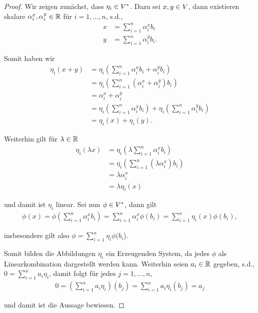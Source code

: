 \begin{proof}
 Wir zeigen zunächst, dass \(\eta_i\in V^\ast\). Dazu sei \(x,y\in V\), dann existieren skalare
\(\alpha_i^x,\alpha_i^y\in\mathbb{R}\) für \(i=1,\ldots,n\), s.d.,
\begin{align*}
x &= \sum_{i=1}^n \alpha_i^x b_i\\
y &= \sum_{i=1}^n \alpha_i^y b_i.
\end{align*}
\par
Somit haben wir
\begin{align*}
\eta_i(x+y) &= \eta_i\left(\sum_{i=1}^n \alpha_i^x b_i + \alpha_i^y b_i\right) 
\\&=
\eta_i\left(\sum_{i=1}^n (\alpha_i^x + \alpha_i^y) b_i\right) 
\\&=
\alpha_i^x + \alpha_i^y
\\&=
\eta_i\left(\sum_{i=1}^n \alpha_i^x b_i\right)  + \eta_i\left(\sum_{i=1}^n \alpha_i^y b_i\right)
\\&=
\eta_i(x) + \eta_i(y).
\end{align*}
\par
Weiterhin gilt für \(\lambda\in\mathbb{R}\)
\begin{align*}
\eta_i(\lambda x) &= \eta_i\left(\lambda \sum_{i=1}^n \alpha_i^x b_i\right) 
\\&=
\eta_i\left(\sum_{i=1}^n (\lambda \alpha_i^x) b_i\right) 
\\&=
\lambda \alpha_i^x
\\&=
\lambda \eta_i(x)
\end{align*}
\par
und damit ist \(\eta_i\) linear.
Sei nun \(\phi\in V^\ast\), dann gilt
\begin{align*}
\phi(x) = \phi\left(\sum_{i=1}^n \alpha_i^x b_i\right) = \sum_{i=1}^n \alpha_i^x \phi(b_i) = 
\sum_{i=1}^n \eta_i(x) \phi(b_i),
\end{align*}
\par
insbesondere gilt also \(\phi = \sum_{i=1}^n \eta_i \phi(b_i\)).

\par
Somit bilden die Abbildungen \(\eta_i\) ein Erzeugenden System, da jedes \(\phi\) als Linearkombination dargestellt werden kann.
Weiterhin seien \(a_i\in\mathbb{R}\) gegeben, s.d., \(0 = \sum_{i=1}^n a_i \eta_i\), damit folgt für jedes \(j=1,\ldots,n\),
\begin{align*}
0 = \left(\sum_{i=1}^n a_i \eta_i\right)(b_j) = \sum_{i=1}^n a_i \eta_i(b_j) = a_j
\end{align*}
\par
und damit ist die Aussage bewiesen.
\end{proof}
